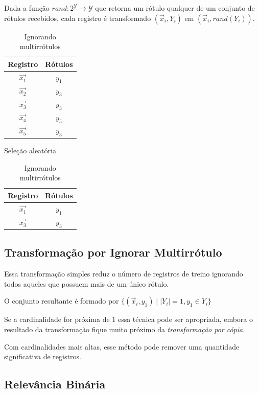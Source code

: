 \documentclass[runningheads,a4paper]{llncs}
\begin{document}
Dada a função $rand : 2^\mathcal{Y} \to \mathcal{Y}$ que retorna um rótulo qualquer de um conjunto de rótulos recebidos, cada registro é transformado $(\vec{x}_i, Y_i)$ em $(\vec{x}_i, rand(Y_i))$.

\begin{table}
\parbox{.45\linewidth}{
	\centering
	\begin{tabular}{| c | c |}
		\hline
		\textbf{Registro} & \textbf{Rótulos} \\
		\hline
		$\vec{x_1}$ & $y_1$ \\
		\hline
		$\vec{x_2}$ & $y_3$ \\
		\hline
		$\vec{x_3}$ & $y_3$ \\
		\hline
		$\vec{x_4}$ & $y_5$ \\
		\hline
		$\vec{x_5}$ & $y_3$ \\
		\hline
	\end{tabular}
	\caption{Seleção aleatória}
	\label{tab:exrand}
}
\parbox{.45\linewidth}{
	\centering
	\begin{tabular}{| c | c |}
		\hline
		\textbf{Registro} & \textbf{Rótulos} \\
		\hline
		$\vec{x_1}$ & $y_1$ \\
		\hline
		$\vec{x_3}$ & $y_3$ \\
		\hline
	\end{tabular}
	\caption{Ignorando multirrótulos}
	\label{tab:exignora}
}
\end{table}

\subsection{Transformação por Ignorar Multirrótulo} \label{subsec:ignorarmultirrotulo}

Essa transformação simples reduz o número de registros de treino ignorando todos aqueles que possuem mais de um único rótulo.

O conjunto resultante é formado por $\{ (\vec{x}_i, y_1) \mid |Y_i| = 1, y_1 \in Y_i \}$


Se a cardinalidade for próxima de 1 essa técnica pode ser apropriada, embora o resultado da transformação fique muito próximo da \textit{transformação por cópia}.

Com cardinalidades mais altas, esse método pode remover uma quantidade significativa de registros.

\subsection{Relevância Binária} \label{subsec:relevanciabinaria}
\end{document}
